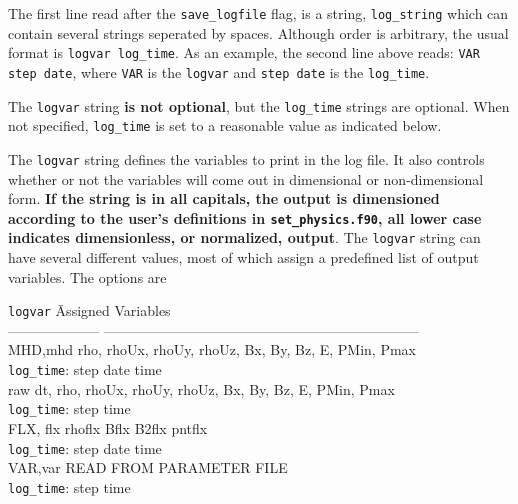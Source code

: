The first line read after the {\tt save\_logfile} flag, is a string, {\tt log\_string}
which can contain several strings seperated by spaces.  Although order is
arbitrary, the usual format is {\tt  logvar log\_time}.  
As an example,  the second line above reads: {\tt VAR step date}, where {\tt VAR}
is the {\tt logvar} and {\tt step date} is the {\tt log\_time}.

The {\tt logvar} string {\bf is not optional}, but the {\tt log\_time} 
strings are optional.
When not specified, {\tt log\_time} is set to a reasonable value as indicated below.

The {\tt logvar} string defines the variables to print in the log file.
It also controls whether or not the variables will come out in
dimensional or non-dimensional form.  {\bf If the string is in all capitals,
the output is dimensioned according to the user's definitions in 
{\tt set\_physics.f90},
all lower case indicates dimensionless, or normalized, output}. 
The {\tt logvar} string can have several different values, most of
which assign a predefined list of output variables. The options are
\begin{tabbing}
{\tt logvar}     \hspace{1.25in} \=  Assigned Variables \\
-------------------- \> -------------------------------------------------------------------- \\

MHD,mhd \> rho, rhoUx, rhoUy, rhoUz, Bx, By, Bz, E, PMin, Pmax \\
        \> {\tt log\_time}: step date time \\
raw     \> dt, rho, rhoUx, rhoUy, rhoUz, Bx, By, Bz, E, PMin, Pmax \\
        \> {\tt log\_time}: step time \\
FLX, flx \> rhoflx Bflx B2flx pntflx \\
        \> {\tt log\_time}: step date time \\
VAR,var \> READ FROM PARAMETER FILE \\
        \> {\tt log\_time}: step time
\end{tabbing}

